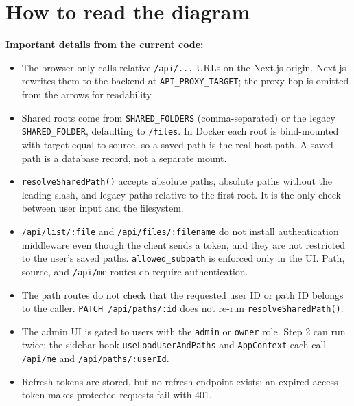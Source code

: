 \documentclass[10pt]{article}
\begin{document}
\section*{How to read the diagram}
\noindent\textbf{Important details from the current code:}
\begin{itemize}
  \setlength\itemsep{0pt}
  \item The browser only calls relative \texttt{/api/...} URLs on the Next.js origin. Next.js rewrites them to the backend at \texttt{API\_PROXY\_TARGET}; the proxy hop is omitted from the arrows for readability.
  \item Shared roots come from \texttt{SHARED\_FOLDERS} (comma-separated) or the legacy \texttt{SHARED\_FOLDER}, defaulting to \texttt{/files}. In Docker each root is bind-mounted with target equal to source, so a saved path is the real host path. A saved path is a database record, not a separate mount.
  \item \texttt{resolveSharedPath()} accepts absolute paths, absolute paths without the leading slash, and legacy paths relative to the first root. It is the only check between user input and the filesystem.
  \item \texttt{/api/list/:file} and \texttt{/api/files/:filename} do not install authentication middleware even though the client sends a token, and they are not restricted to the user's saved paths. \texttt{allowed\_subpath} is enforced only in the UI. Path, source, and \texttt{/api/me} routes do require authentication.
  \item The path routes do not check that the requested user ID or path ID belongs to the caller. \texttt{PATCH /api/paths/:id} does not re-run \texttt{resolveSharedPath()}.
  \item The admin UI is gated to users with the \texttt{admin} or \texttt{owner} role. Step 2 can run twice: the sidebar hook \texttt{useLoadUserAndPaths} and \texttt{AppContext} each call \texttt{/api/me} and \texttt{/api/paths/:userId}.
  \item Refresh tokens are stored, but no refresh endpoint exists; an expired access token makes protected requests fail with 401.
\end{itemize}
\end{document}
